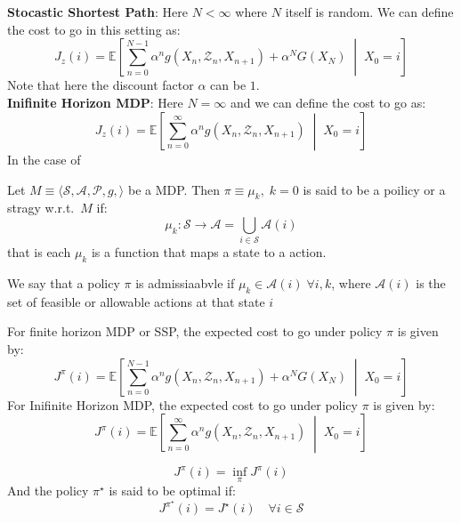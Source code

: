 \textbf{Stocastic Shortest Path}: Here \(N<\infty \) where \(N\) itself is random. We can define the
cost to go in this setting as:
\[
    J_z(i) = \mathbb{E} \left[
    \sum_{n=0}^{N-1} \alpha ^n g(X_n,\mathcal{Z}_n,X_{n+1}) + \alpha ^N G(X_N) \;\middle|\;  X_0 = i
     \right]  
\]
Note that here the discount factor \(\alpha \) can be \(1\).\\

\textbf{Inifinite Horizon MDP}: Here \(N = \infty \) and we can define the cost to go as:
\[
    J_z(i) = \mathbb{E} \left[ 
    \sum_{n=0}^{\infty} \alpha ^n g(X_n,\mathcal{Z}_n,X_{n+1}) \;\middle|\;  X_0 = i
     \right]
\]
In the case of 
\begin{definition}[Policy]
    Let \(M\equiv \langle \mathcal{S} ,\mathcal{A} ,\mathcal{P} ,g,\rangle \) be a MDP. Then 
    \(\pi \equiv \mu _k, \; k = 0 \) is said to be a poilicy or a stragy w.r.t.\  \(M\) if:
    \[
        \mu _k : \mathcal{S} \to \mathcal{A} = \bigcup\limits_{i\in \mathcal{S} } \mathcal{A} (i)  
    \]
    that is each \(\mu _k\) is a function that maps a state to a action.\\ 
\end{definition}
We say that a policy \(\pi \) is admissiaabvle if \(\mu _k \in \mathcal{A}(i)\; \forall i,k\),
where \(\mathcal{A} (i)\) is the set of feasible or allowable actions at that state \(i\)
\begin{definition}
    For finite horizon MDP or SSP, the expected cost to go under policy \(\pi\) is given by:
    \[
        J^{\pi}(i) = \mathbb{E} \left[
        \sum_{n=0}^{N-1} \alpha ^n g(X_n,\mathcal{Z}_n,X_{n+1}) + \alpha ^N G(X_N) \;\middle|\; X_0 = i
         \right] 
    \]
    For Inifinite Horizon MDP, the expected cost to go under policy \(\pi\) is given by:
    \[
        J^{\pi}(i) = \mathbb{E} \left[ 
        \sum_{n=0}^{\infty} \alpha ^n g(X_n,\mathcal{Z}_n,X_{n+1}) \;\middle|\;  X_0 = i
         \right]
    \]
\end{definition}
\begin{definition}
    \[
        J^{\pi} (i) = \inf _{\pi} J^{\pi} (i) 
    \]
    And the policy \(\pi ^{\star} \) is said to be optimal if:
    \[
        J^{\pi ^{\star}} (i) = J^{\star} (i) \quad \forall i \in \mathcal{S} 
    \] 
\end{definition}

